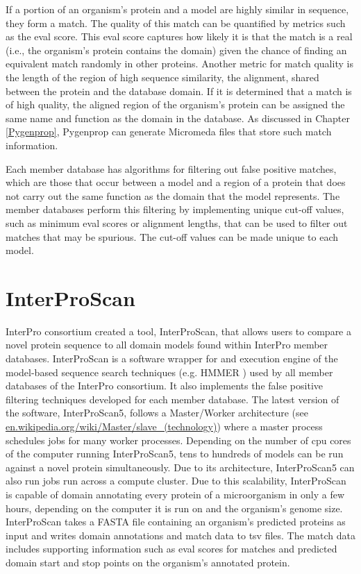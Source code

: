 If a portion of an organism's protein and a model are highly similar in sequence, they form a match. The quality of this match can be quantified by metrics such as the \gls{eval} score. This \gls{eval} score captures how likely it is that the match is a real (i.e., the organism's protein contains the domain) given the chance of finding an equivalent match randomly in other proteins. Another metric for match quality is the length of the region of high sequence similarity, the alignment, shared between the protein and the database domain. If it is determined that a match is of high quality, the aligned region of the organism's protein can be assigned the same name and function as the domain in the database.  As discussed in Chapter \ref{Pygenprop}, Pygenprop can generate Micromeda files that store such match information.

Each member database has algorithms for filtering out false positive matches, which are those that occur between a model and a region of a protein that does not carry out the same function as the domain that the model represents. The member databases perform this filtering by implementing unique cut-off values, such as minimum \gls{eval} scores or alignment lengths, that can be used to filter out matches that may be spurious. The cut-off values can be made unique to each model. 

\section{InterProScan} \label{overview-interproscan}

InterPro consortium created a tool, InterProScan, that allows users to compare a novel protein sequence to all domain models found within InterPro member databases. InterProScan is a software wrapper for and execution engine of the model-based sequence search techniques (e.g. HMMER \cite{eddy2011accelerated}) used by all member databases of the InterPro consortium. It also implements the false positive filtering techniques developed for each member database. The latest version of the software, InterProScan5, follows a Master/Worker architecture (see \href{en.wikipedia.org/wiki/Master/slave\_(technology)}{en.wikipedia.org/wiki/Master/slave\_(technology)}) where a master process schedules jobs for many worker processes. Depending on the number of \gls{cpu} cores of the computer running InterProScan5, tens to hundreds of models can be run against a novel protein simultaneously. Due to its architecture, InterProScan5 can also run jobs run across a compute cluster. Due to this scalability, InterProScan is capable of domain annotating every protein of a microorganism in only a few hours, depending on the computer it is run on and the organism's genome size. InterProScan takes a FASTA file \cite{pearson19905} containing an organism's predicted proteins as input and writes domain annotations and match data to \gls{tsv} files. The match data includes supporting information such as \gls{eval} scores for matches and predicted domain start and stop points on the organism's annotated protein.

